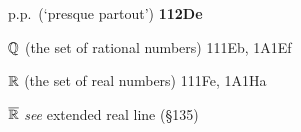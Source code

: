 p.p.\ (`presque partout') {\bf 112De}



\indexmedskip
{}

$\Bbb Q$ (the set of rational numbers) 111Eb, 1A1Ef





\indexmedskip
{}

$\Bbb R$ (the set of real numbers) 111Fe, 1A1Ha






$\overline{\Bbb R}$ {\it see} extended real line (\S135)



























































































